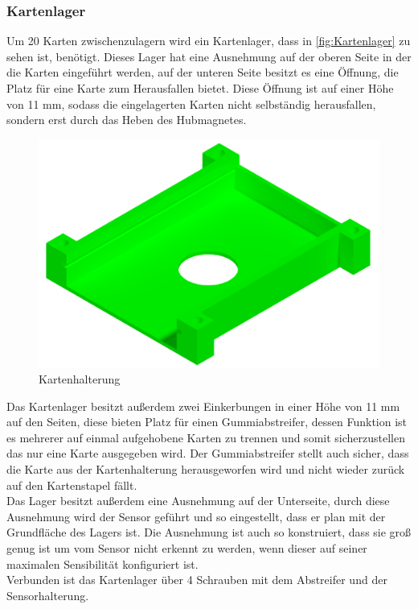 \subsubsection{Kartenlager}

Um 20 Karten zwischenzulagern wird ein Kartenlager, dass in \autoref{fig:Kartenlager} zu sehen ist, benötigt. Dieses Lager hat eine Ausnehmung auf der oberen Seite in der die Karten
eingeführt werden, auf der unteren Seite besitzt es eine Öffnung, die Platz für eine Karte zum Herausfallen bietet. Diese Öffnung ist auf
einer Höhe von 11 mm, sodass die eingelagerten Karten nicht selbständig  herausfallen, sondern erst durch das Heben des Hubmagnetes.\\
\begin{figure}
    \includegraphics[width=8 cm]{fig/mech/Kartenhalterung}
    \caption{Kartenhalterung}
    \label{fig:Kartenlager}
\end{figure}
Das Kartenlager besitzt außerdem zwei Einkerbungen in einer Höhe von 11 mm auf den Seiten, diese bieten Platz für einen Gummiabstreifer,
dessen Funktion ist es mehrerer auf einmal aufgehobene Karten zu trennen und somit sicherzustellen das nur eine Karte ausgegeben wird.
Der Gummiabstreifer stellt auch sicher, dass die Karte aus der Kartenhalterung herausgeworfen wird und nicht wieder zurück auf den Kartenstapel
fällt. \\
Das Lager besitzt außerdem eine Ausnehmung auf der Unterseite, durch diese Ausnehmung wird der Sensor geführt und so eingestellt,
dass er plan mit der Grundfläche des Lagers ist. Die Ausnehmung ist auch so konstruiert, dass sie groß genug ist um vom Sensor
nicht erkennt zu werden, wenn dieser auf seiner maximalen Sensibilität konfiguriert ist.\\
Verbunden ist das Kartenlager über 4 Schrauben mit dem Abstreifer und der Sensorhalterung.



